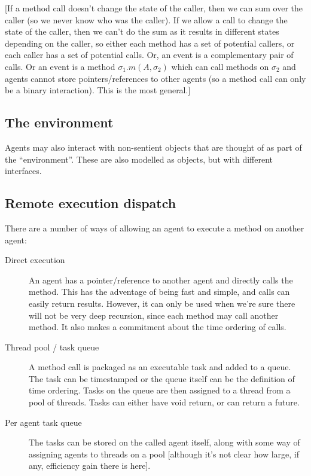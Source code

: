 \documentclass[a4paper]{article}
\begin{document}
[If a method call doesn't change the state of the caller, then we can sum over the caller (so we never know who was the caller). If we allow a call to change the state of the caller, then we can't do the sum as it results in different states depending on the caller, so either each method has a set of potential callers, or each caller has a set of potential calls. Or, an event is a complementary pair of calls. Or an event is a method $\sigma_1.m(A, \sigma_2)$ which can call methods on $\sigma_2$ and agents cannot store pointers/references to other agents (so a method call can only be a binary interaction). This is the most general.]


\subsection{The environment}

Agents may also interact with non-sentient objects that are thought of as part of the ``environment''. These are also modelled as objects, but with different interfaces. 

\subsection{Remote execution dispatch}

There are a number of ways of allowing an agent to execute a method on another agent:
\begin{description}

\item[Direct execution] An agent has a pointer/reference to another agent and directly calls the method. This has the adventage of being fast and simple, and calls can easily return results. However, it can only be used when we're sure there will not be very deep recursion, since each method may call another method. It also makes a commitment about the time ordering of calls.

\item[Thread pool / task queue] A method call is packaged as an executable task and added to a queue. The task can be timestamped or the queue itself can be the definition of time ordering. Tasks on the queue are then assigned to a thread from a pool of threads. Tasks can either have void return, or can return a future. 

\item[Per agent task queue] The tasks can be stored on the called agent itself, along with some way of assigning agents to threads on a pool [although it's not clear how large, if any, efficiency gain there is here].

\end{description}
\end{document}
